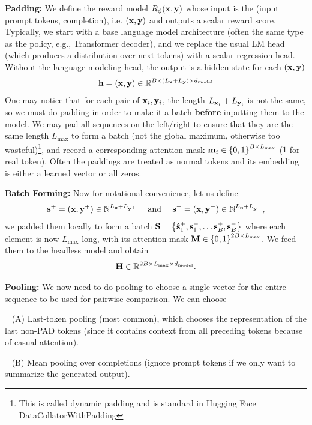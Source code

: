\documentclass[11pt]{article}  %
\begin{document}
\textbf{Padding:} We define the reward model $R_{\phi}(\mathbf{x}, \mathbf{y})$ whose input is the (input prompt tokens, completion), i.e. $(\mathbf{x}, \mathbf{y})$ and outputs a scalar reward score.
Typically, we start with a base language model architecture (often the same type as the policy, e.g., Transformer decoder), and we replace the usual LM head (which produces a distribution over next tokens) with a scalar regression head. 
Without the language modeling head, the output is a hidden state for each $(\mathbf{x}, \mathbf{y})$
\begin{align*}
  \mathbf{h} = \left( \mathbf{x}, \mathbf{y} \right) \in \mathbb{R}^{B \times (L_{\mathbf{x}} + L_{\mathbf{y}}) \times d_{\text{model}}}
\end{align*}
One may notice that for each pair of $\mathbf{x}_i, \mathbf{y}_i$, the length $L_{\mathbf{x}_i} + L_{\mathbf{y}_i}$ is not the same, so we must do padding in order to make it a batch \textbf{before} inputting them to the model.
We may pad all sequences on the left/right to ensure that they are the same length $L_{\max}$ to form a batch (not the global maximum, otherwise too wasteful)\footnote{This is called dynamic padding and is standard in Hugging Face DataCollatorWithPadding}, and record a corresponding attention mask $\mathbf{m}_i \in \left\{ 0, 1 \right\}^{B \times L_{\max}}$ ($1$ for real token).
Often the paddings are treated as normal tokens and its embedding is either a learned vector or all zeros. 

\textbf{Batch Forming:} Now for notational convenience, let us define 
\begin{align*}
  \mathbf{s}^+ = (\mathbf{x}, \mathbf{y}^+) \in \mathbb{N}^{L_{\mathbf{x}} + L_{\mathbf{y}^+}} \quad \text{ and } \quad \mathbf{s}^- = (\mathbf{x}, \mathbf{y}^-) \in \mathbb{N}^{L_{\mathbf{x}} + L_{\mathbf{y}^-}},
\end{align*}
we padded them locally to form a batch $\mathbf{S} = \left\{ \hat{\mathbf{s}}_1^+, {\mathbf{s}}_1^-, \hdots {\mathbf{s}}_B^+, {\mathbf{s}}_B^- \right\}$ where each element is now $L_{\max}$ long, with its attention mask $\mathbf{M} \in \left\{ 0, 1 \right\}^{2B \times L_{\max}}$.
We feed them to the headless model and obtain 
\begin{align*}
  \mathbf{H} \in \mathbb{R}^{2B \times L_{\max} \times d_{\text{model}}}.
\end{align*}

\textbf{Pooling:} We now need to do pooling to choose a single vector for the entire sequence to be used for pairwise comparison. 
We can choose 

\textbullet~ (A) Last-token pooling (most common), which chooses the representation of the last non-PAD tokens (since it contains context from all preceding tokens because of casual attention). 

\textbullet~ (B) Mean pooling over completions (ignore prompt tokens if we only want to summarize the generated output).
\end{document}
